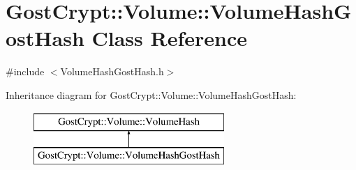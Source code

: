 \hypertarget{class_gost_crypt_1_1_volume_1_1_volume_hash_gost_hash}{}\section{Gost\+Crypt\+:\+:Volume\+:\+:Volume\+Hash\+Gost\+Hash Class Reference}
\label{class_gost_crypt_1_1_volume_1_1_volume_hash_gost_hash}


{\ttfamily \#include $<$Volume\+Hash\+Gost\+Hash.\+h$>$}

Inheritance diagram for Gost\+Crypt\+:\+:Volume\+:\+:Volume\+Hash\+Gost\+Hash\+:\begin{figure}[H]
\begin{center}
\leavevmode
\includegraphics[height=2.000000cm]{class_gost_crypt_1_1_volume_1_1_volume_hash_gost_hash}
\end{center}
\end{figure}
